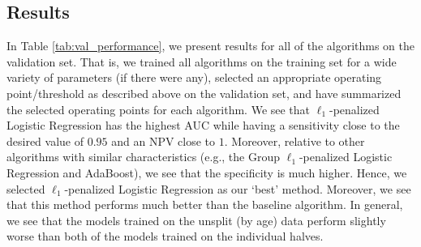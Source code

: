 \documentclass[11pt, letterpaper]{amsart}
\let\Oldsubsection\subsection
\renewcommand{\subsection}{\FloatBarrier\Oldsubsection}
\begin{document}
\subsection{Results} 

In Table \ref{tab:val_performance}, we present results for all of the algorithms on the validation set. That is, we trained all algorithms on the training set for a wide variety of parameters (if there were any), selected an appropriate operating point/threshold as described above on the validation set, and have summarized the selected operating points for each algorithm. We see that $\ell_1$-penalized Logistic Regression has the highest AUC while having a sensitivity close to the desired value of $0.95$ and an NPV close to $1$. Moreover, relative to other algorithms with similar characteristics (e.g., the Group $\ell_1$-penalized Logistic Regression and AdaBoost), we see that the specificity is much higher. Hence, we selected $\ell_1$-penalized Logistic Regression as our `best' method. Moreover, we see that this method performs much better than the baseline algorithm. In general, we see that the models trained on the unsplit (by age) data perform slightly worse than both of the models trained on the individual halves. 
\end{document}
